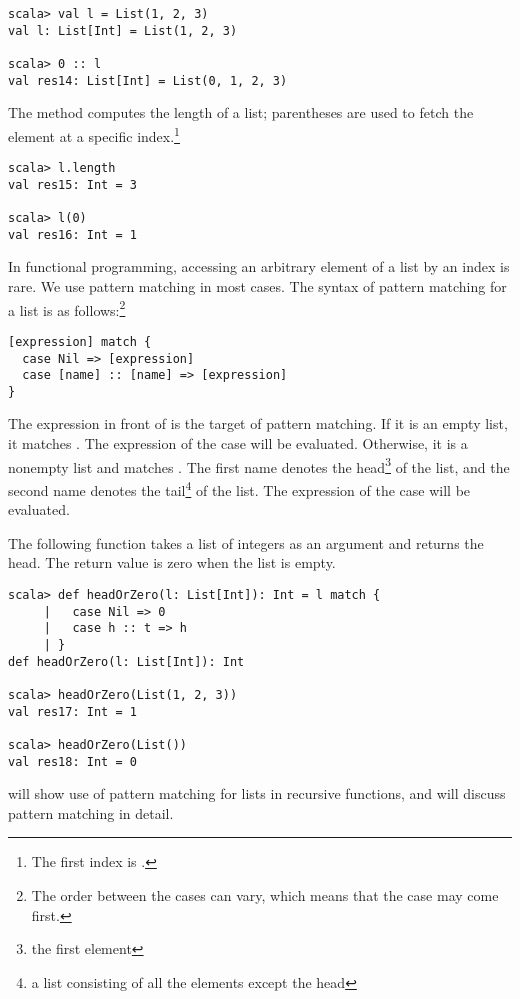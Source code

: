 \begin{verbatim}
scala> val l = List(1, 2, 3)
val l: List[Int] = List(1, 2, 3)

scala> 0 :: l
val res14: List[Int] = List(0, 1, 2, 3)
\end{verbatim}

The  method computes the length of a list; parentheses are used
to fetch the element at a specific index.\footnote{The first index is .}

\begin{verbatim}
scala> l.length
val res15: Int = 3

scala> l(0)
val res16: Int = 1
\end{verbatim}

In functional programming, accessing an arbitrary element of a list by an index
is rare. We use pattern matching in most cases. The syntax of pattern matching
for a list is as follows:\footnote{The order between the cases can vary, which
means that the \code{::} case may come first.}

\begin{verbatim}
[expression] match {
  case Nil => [expression]
  case [name] :: [name] => [expression]
}
\end{verbatim}

The expression in front of  is the target of pattern matching.
If it is an empty list, it matches . The expression
of the  case will be evaluated.
Otherwise, it is a nonempty list and matches . The first
name denotes the head\footnote{the first element} of the list, and the second
name denotes the tail\footnote{a list consisting of all the elements except the
head} of the list. The expression of the \code{::} case will be evaluated.

The following function takes a list of integers as an argument and returns the
head. The return value is zero when the list is empty.

\begin{verbatim}
scala> def headOrZero(l: List[Int]): Int = l match {
     |   case Nil => 0
     |   case h :: t => h
     | }
def headOrZero(l: List[Int]): Int

scala> headOrZero(List(1, 2, 3))
val res17: Int = 1

scala> headOrZero(List())
val res18: Int = 0
\end{verbatim}

 will show use of pattern matching for lists in recursive
functions, and  will discuss pattern matching in detail.

